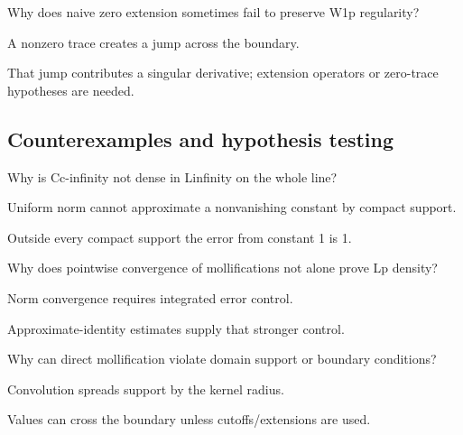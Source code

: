 \begin{exercise}\label{exr:iii22-expand-09}
Why does naive zero extension sometimes fail to preserve W1p regularity?
\end{exercise}
\begin{hint}
A nonzero trace creates a jump across the boundary.
\end{hint}
\begin{solution}
That jump contributes a singular derivative; extension operators or zero-trace hypotheses are needed.
\end{solution}

\subsection*{Counterexamples and hypothesis testing}

\begin{exercise}\label{exr:iii22-expand-10}
Why is Cc-infinity not dense in Linfinity on the whole line?
\end{exercise}
\begin{hint}
Uniform norm cannot approximate a nonvanishing constant by compact support.
\end{hint}
\begin{solution}
Outside every compact support the error from constant 1 is 1.
\end{solution}

\begin{exercise}\label{exr:iii22-expand-11}
Why does pointwise convergence of mollifications not alone prove Lp density?
\end{exercise}
\begin{hint}
Norm convergence requires integrated error control.
\end{hint}
\begin{solution}
Approximate-identity estimates supply that stronger control.
\end{solution}

\begin{exercise}\label{exr:iii22-expand-12}
Why can direct mollification violate domain support or boundary conditions?
\end{exercise}
\begin{hint}
Convolution spreads support by the kernel radius.
\end{hint}
\begin{solution}
Values can cross the boundary unless cutoffs/extensions are used.
\end{solution}

